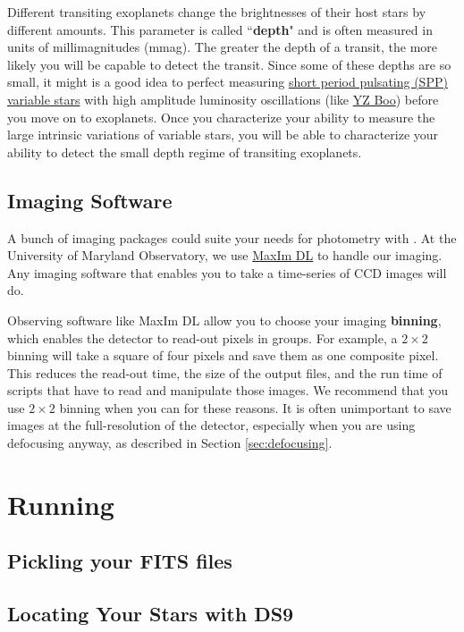 \documentclass{article}
\begin{document}
Different transiting exoplanets change the brightnesses of their host stars by different amounts. This parameter is called ``\textbf{depth}" and is often measured in units of millimagnitudes (mmag). The greater the depth of a transit, the more likely you will be capable to detect the transit. Since some of these depths are so small, it might is a good idea to perfect measuring \href{https://sites.google.com/site/aavsosppsection/}{short period pulsating (SPP) variable stars} with high amplitude luminosity oscillations (like \href{http://www.aavso.org/vsx/index.php?view=detail.top&oid=4356}{YZ Boo}) before you move on to exoplanets. Once you characterize your ability to measure the large intrinsic variations of variable stars, you will be able to characterize your ability to detect the small depth regime of transiting exoplanets. 

\subsection{Imaging Software}
A bunch of imaging packages could suite your needs for photometry with \oscaar. At the University of Maryland Observatory, we use \href{http://www.cyanogen.com/maxim_main.php}{MaxIm DL} to handle our imaging. Any imaging software that enables you to take a time-series of CCD images will do. 

Observing software like MaxIm DL allow you to choose your imaging \textbf{binning}, which enables the detector to read-out pixels in groups. For example, a $2\times2$ binning will take a square of four pixels and save them as one composite pixel. This reduces the read-out time, the size of the output files, and the run time of scripts that have to read and manipulate those images. We recommend that you use $2\times2$ binning when you can for these reasons. It is often unimportant to save images at the full-resolution of the detector, especially when you are using defocusing anyway, as described in Section \ref{sec:defocusing}. 

\section{Running \oscaar} \label{sec:run}

\subsection{Pickling your FITS files}

\subsection{Locating Your Stars with DS9}
\end{document}
